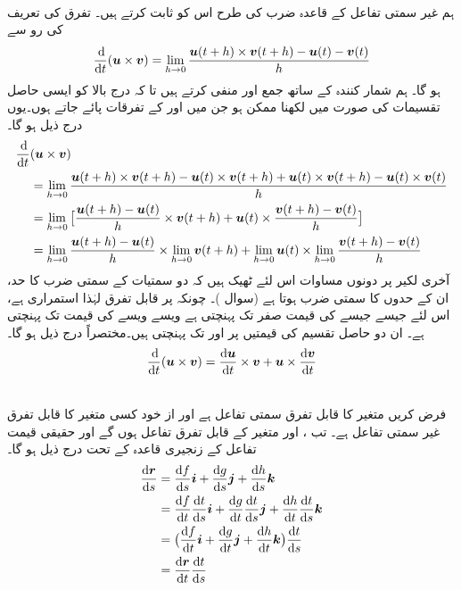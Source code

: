 \\
ہم غیر سمتی تفاعل کے قاعدہ ضرب کی طرح اس کو ثابت کرتے ہیں۔ تفرق کی تعریف کی رو سے
\begin{align*}
\frac{\dif}{\dif t}(\kvec{u}\times \kvec{v})=\lim_{h\to 0}\frac{\kvec{u}(t+h)\times \kvec{v}(t+h)-\kvec{u}(t)-\kvec{v}(t)}{h}
\end{align*}
ہو گا۔ ہم  شمار کنندہ  کے ساتھ    جمع اور منفی کرتے ہیں تا کہ درج بالا   کو ایسی حاصل تقسیمات  کی صورت میں لکھنا ممکن ہو جن میں   اور  کے تفرقات    پائے جاتے ہوں۔یوں درج ذیل ہو گا۔
\begin{align*}
\frac{\dif}{\dif t}&(\kvec{u}\times \kvec{v})\\
&=\lim_{h\to 0}\frac{\kvec{u}(t+h)\times \kvec{v}(t+h)-\kvec{u}(t)\times \kvec{v}(t+h)+\kvec{u}(t)\times \kvec{v}(t+h)-\kvec{u}(t)\times \kvec{v}(t)}{h}\\
&=\lim_{h\to 0}\big[\frac{\kvec{u}(t+h)-\kvec{u}(t)}{h}\times \kvec{v}(t+h)+\kvec{u}(t)\times \frac{\kvec{v}(t+h)-\kvec{v}(t)}{h}\big]\\
&=\lim_{h\to 0}\frac{\kvec{u}(t+h)-\kvec{u}(t)}{h}\times \lim_{h\to 0}\kvec{v}(t+h)+\lim_{h\to 0}\kvec{u}(t)\times \lim_{h\to 0}\frac{\kvec{v}(t+h)-\kvec{v}(t)}{h}
\end{align*}
آخری لکیر پر دونوں مساوات اس لئے ٹھیک ہیں کہ دو سمتیات کے سمتی ضرب کا حد،  ان کے حدوں کا سمتی ضرب ہوتا ہے (سوال )۔  چونکہ  پر  قابل تفرق لہٰذا استمراری ہے، اس لئے   جیسے جیسے  کی قیمت صفر تک پہنچتی ہے ویسے ویسے   کی قیمت  تک پہنچتی ہے۔ ان  دو حاصل تقسیم کی قیمتیں   پر   اور  تک پہنچتی ہیں۔مختصراً درج ذیل ہو گا۔
\begin{align*}
\frac{\dif}{\dif t}(\kvec{u}\times\kvec{v})=\frac{\dif \kvec{u}}{\dif t}\times \kvec{v}+\kvec{u}\times\frac{\dif \kvec{v}}{\dif t}
\end{align*} 

\\
فرض کریں  متغیر  کا قابل تفرق سمتی  تفاعل ہے اور  از خود کسی متغیر  کا قابل تفرق غیر سمتی تفاعل ہے۔ تب ،  اور  متغیر  کے قابل تفرق تفاعل ہوں گے  اور حقیقی قیمت تفاعل کے زنجیری قاعدہ کے تحت درج ذیل ہو گا۔
\begin{align*}
\frac{\dif \kvec{r}}{\dif s}&=\frac{\dif f}{\dif s}\ai+\frac{\dif g}{\dif s}\aj+\frac{\dif h}{\dif s}\ak\\
&=\frac{\dif f}{\dif t}\frac{\dif t}{\dif s}\ai+\frac{\dif g}{\dif t}\frac{\dif t}{\dif s}\aj+\frac{\dif h}{\dif t}\frac{\dif t}{\dif s}\ak\\
&=\big(\frac{\dif f}{\dif t}\ai+\frac{\dif g}{\dif t}\aj+\frac{\dif h}{\dif t}\ak\big)\frac{\dif t}{\dif s}\\
&=\frac{\dif \kvec{r}}{\dif t}\frac{\dif t}{\dif s}
\end{align*}

